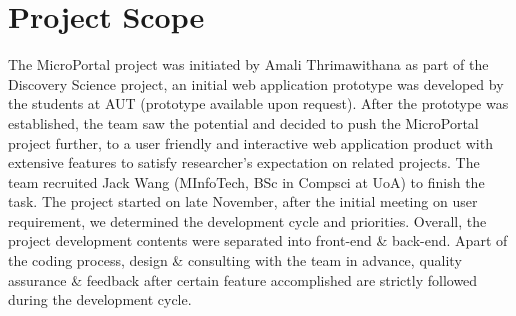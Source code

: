 \documentclass{scrreprt}
\begin{document}
\section{Project Scope}
The MicroPortal project was initiated by Amali Thrimawithana as part of the Discovery Science project, an initial web application prototype was developed by the students at AUT (prototype available upon request). After the prototype was established, the team saw the potential and decided to push the MicroPortal project further, to a user friendly and interactive web application product with extensive features to satisfy researcher's expectation on related projects. The team recruited Jack Wang (MInfoTech, BSc in Compsci at UoA) to finish the task.
\newline
The project started on late November, after the initial meeting on user requirement, we determined the development cycle and priorities. Overall, the project development contents were separated into front-end \& back-end. Apart of the coding process, design \& consulting with the team in advance, quality assurance \& feedback after certain feature accomplished are strictly followed during the development cycle.  
\end{document}
